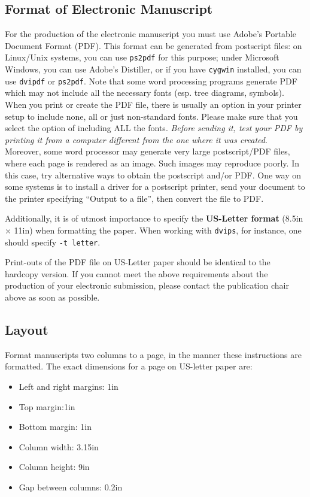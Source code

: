 \documentclass[11pt]{article}
\begin{document}
\subsection{Format of Electronic Manuscript}
\label{sect:pdf}

For the production of the electronic manuscript you must use Adobe's
Portable Document Format (PDF). This format can be generated from
postscript files: on Linux/Unix systems, you can use {\tt ps2pdf} for this
purpose; under Microsoft Windows, you can use Adobe's Distiller, or
if you have {\tt cygwin} installed, you can use {\tt dvipdf} or
{\tt ps2pdf}.  Note
that some word processing programs generate PDF which may not include
all the necessary fonts (esp. tree diagrams, symbols). When you print
or create the PDF file, there is usually an option in your printer
setup to include none, all or just non-standard fonts.  Please make
sure that you select the option of including ALL the fonts.  {\em Before sending it, test your PDF by printing it from a computer different from the one where it was created}. Moreover,
some word processor may generate very large postscript/PDF files,
where each page is rendered as an image. Such images may reproduce
poorly.  In this case, try alternative ways to obtain the postscript
and/or PDF.  One way on some systems is to install a driver for a
postscript printer, send your document to the printer specifying
``Output to a file'', then convert the file to PDF.

Additionally, it is of utmost importance to specify the {\bf US-Letter format} (8.5in $\times$ 11in) when formatting the paper. When working with {\tt dvips}, for instance, one should specify {\tt -t letter}.

Print-outs of the PDF file on US-Letter paper should be identical to the
hardcopy version.  If you cannot meet the above requirements about the
production of your electronic submission, please contact the
publication chair above as soon as possible.


\subsection{Layout}
\label{ssec:layout}

Format manuscripts two columns to a page, in the manner these
instructions are formatted. The exact dimensions for a page on US-letter
paper are:

\begin{itemize}
\item Left and right margins: 1in
\item Top margin:1in
\item Bottom margin: 1in
\item Column width: 3.15in
\item Column height: 9in
\item Gap between columns: 0.2in
\end{itemize}
\end{document}
